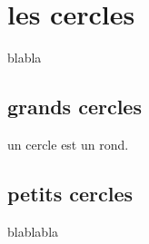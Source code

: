 \section{les cercles}

blabla 

\subsection{grands cercles}

\begin{definition}[cercle]
un cercle est un rond.
\end{definition}

\subsection{petits cercles}
blablabla